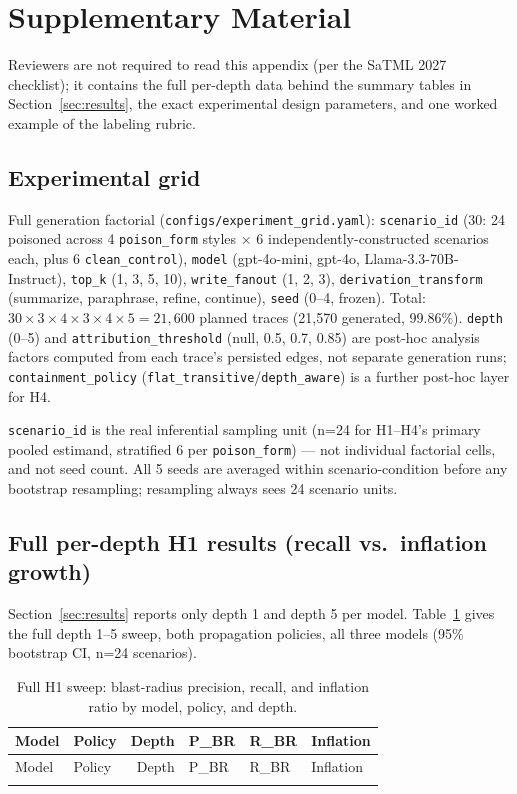 \appendices
\section{Supplementary Material}

Reviewers are not required to read this appendix (per the SaTML 2027
checklist); it contains the full per-depth data behind the summary
tables in Section~\ref{sec:results}, the exact experimental design
parameters, and one worked example of the labeling rubric.

\subsection{Experimental grid}

Full generation factorial (\texttt{configs/experiment\_grid.yaml}):
\texttt{scenario\_id} (30: 24 poisoned across 4 \texttt{poison\_form}
styles $\times$ 6 independently-constructed scenarios each, plus 6
\texttt{clean\_control}), \texttt{model} (gpt-4o-mini, gpt-4o,
Llama-3.3-70B-Instruct), \texttt{top\_k} (1, 3, 5, 10),
\texttt{write\_fanout} (1, 2, 3), \texttt{derivation\_transform}
(summarize, paraphrase, refine, continue), \texttt{seed} (0--4, frozen).
Total: $30 \times 3 \times 4 \times 3 \times 4 \times 5 = 21{,}600$
planned traces (21,570 generated, 99.86\%). \texttt{depth} (0--5) and
\texttt{attribution\_threshold} (null, 0.5, 0.7, 0.85) are post-hoc
analysis factors computed from each trace's persisted edges, not
separate generation runs; \texttt{containment\_policy}
(\texttt{flat\_transitive}/\texttt{depth\_aware}) is a further post-hoc
layer for H4.

\texttt{scenario\_id} is the real inferential sampling unit (n=24 for
H1--H4's primary pooled estimand, stratified 6 per \texttt{poison\_form})
--- not individual factorial cells, and not seed count. All 5 seeds are
averaged within scenario-condition before any bootstrap resampling;
resampling always sees 24 scenario units.

\subsection{Full per-depth H1 results (recall vs.\ inflation growth)}

Section~\ref{sec:results} reports only depth 1 and depth 5 per model.
Table~\ref{tab:appendix-h1} gives the full depth 1--5 sweep, both
propagation policies, all three models (95\% bootstrap CI, n=24
scenarios).

\begin{longtable}{@{}llrlll@{}}
\caption{Full H1 sweep: blast-radius precision, recall, and inflation ratio by model, policy, and depth.}
\label{tab:appendix-h1} \\
\toprule
Model & Policy & Depth & P\_BR & R\_BR & Inflation \\
\midrule
\endfirsthead
\toprule
Model & Policy & Depth & P\_BR & R\_BR & Inflation \\
\midrule
\endhead
\bottomrule
\endfoot

\end{longtable}

